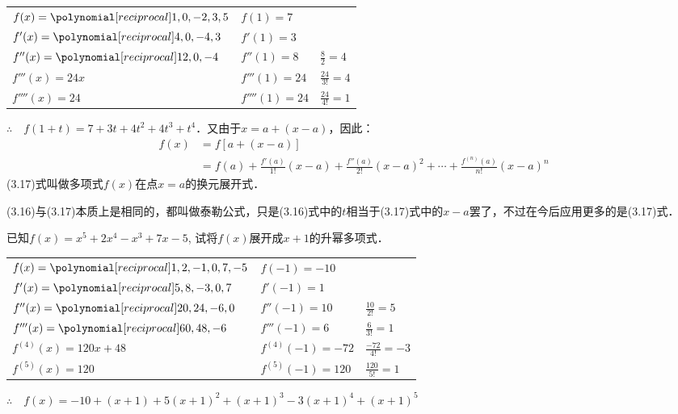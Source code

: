     \begin{solution}
\begin{center}
\begin{tabular}{lll}
$f(x)=\poly{1,0,-2,3,5}$  &  $f(1)=7$  \\
$f'(x)=\poly{4,0,-4,3}$  &  $f'(1)=3$  \\
$f''(x)=\poly{12,0,-4}$  &  $f''(1)=8$& $\frac{8}{2}=4$  \\
$f'''(x)=24x$  &  $f'''(1)=24$ & $\frac{24}{3!}=4$\\
$f''''(x)=24$  &  $f''''(1)=24$ & $\frac{24}{4!}=1$\\
\end{tabular}    
\end{center}

$\therefore\quad f(1+t)=7+3t+4t^2+4t^3+t^4$．又由于$x=a+(x-a)$，因此：
\begin{equation}
    \begin{split}
    f(x)&=f[a+(x-a)]\\
    &=f(a)+\frac{f'(a)}{1!}(x-a)+\frac{f''(a)}{2!}(x-a)^2+\cdots+\frac{f^{(n)}(a)}{n!}(x-a)^n
\end{split}
\end{equation}
(3.17)式叫做多项式$f(x)$在点$x=a$的换元展开式．
    \end{solution}

(3.16)与(3.17)本质上是相同的，都叫做泰勒公式，只是(3.16)式中的$t$相当于(3.17)式中的$x-a$罢了，不过在今后应用更多的是(3.17)式．

 \begin{example}
    已知$f(x)=x^5+2x^4-x^3+7x-5$, 试将$f(x)$展开成$x+1$的升幂多项式．
    \end{example}

    \begin{solution}    
\begin{center}
\begin{tabular}{lll}
$f(x)=\poly{1,2,-1,0,7,-5}$  &  $f(-1)=-10$  \\
$f'(x)=\poly{5,8,-3,0,7}$  &  $f'(-1)=1$  \\
$f''(x)=\poly{20,24,-6,0}$  &  $f''(-1)=10$& $\frac{10}{2!}=5$  \\
$f'''(x)=\poly{60,48,-6}$  &  $f'''(-1)=6$ & $\frac{6}{3!}=1$\\
$f^{(4)}(x)=120x+48$  &  $f^{(4)}(-1)=-72$ & $\frac{-72}{4!}=-3$\\
$f^{(5)}(x)=120$  &  $f^{(5)}(-1)=120$ & $\frac{120}{5!}=1$\\
\end{tabular}    
\end{center}
          
$\therefore\quad f(x)=-10+(x+1)+5(x+1)^2+(x+1)^3-3(x+1)^4+(x+1)^5$
    \end{solution}

